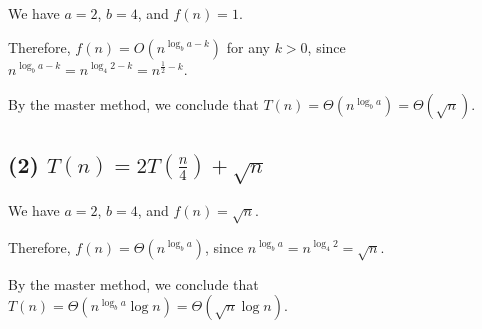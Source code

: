 \documentclass[12pt]{article}
\begin{document}
We have $a = 2$, $b = 4$, and $f(n) = 1$. 

Therefore, $f(n) = O(n^{\log_b a - k})$ for any $k > 0$, since $n^{\log_b a - k} = n^{\log_4 2 - k} = n^{\frac{1}{2} - k}$. 

By the master method, we conclude that $T(n) = \Theta(n^{\log_b a}) = \Theta(\sqrt{n})$.

\subsection{(2) $ T(n) = 2T(\frac{n}{4}) + \sqrt{n}$}

We have $a = 2$, $b = 4$, and $f(n) = \sqrt{n}$. 

Therefore, $f(n) = \Theta(n^{\log_b a})$, since $n^{\log_b a} = n^{\log_4 2} = \sqrt{n}$. 

By the master method, we conclude that $T(n) = \Theta(n^{\log_b a} \log n) = \Theta(\sqrt{n} \log n)$.
\end{document}
